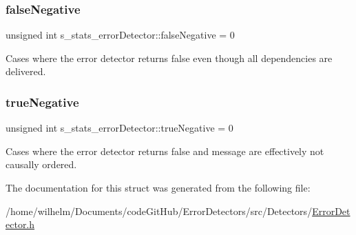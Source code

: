 \subsubsection{\texorpdfstring{false\+Negative}{falseNegative}}
{\footnotesize\ttfamily unsigned int s\+\_\+stats\+\_\+error\+Detector\+::false\+Negative = 0}



Cases where the error detector returns false even though all dependencies are delivered. 

\mbox{\label{structs__stats__error_detector_ad37aeef79761af921bb44f31024c78ce}} 
\subsubsection{\texorpdfstring{true\+Negative}{trueNegative}}
{\footnotesize\ttfamily unsigned int s\+\_\+stats\+\_\+error\+Detector\+::true\+Negative = 0}



Cases where the error detector returns false and message are effectively not causally ordered. 



The documentation for this struct was generated from the following file\+:\begin{DoxyCompactItemize}
\item 
/home/wilhelm/\+Documents/code\+Git\+Hub/\+Error\+Detectors/src/\+Detectors/\hyperlink{_error_detector_8h}{Error\+Detector.\+h}\end{DoxyCompactItemize}
